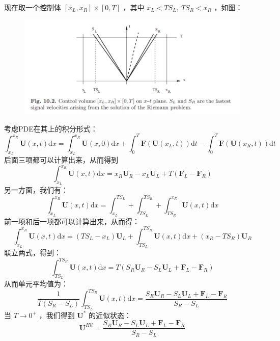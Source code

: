 \documentclass{book}
\begin{document}
\begin{example}
\begin{example}{}{}
\begin{example}
\begin{example}
\begin{example}
现在取一个控制体 $[x_L,x_R]\times[0,T]$ ，其中 $x_L<TS_L,\ TS_R<x_R$ ，如图：
\begin{figure}[htp]
    \centering
    \label{fig:}
    \includegraphics[width=0.7\linewidth]{fig/HLL.png}
    \caption{}
\end{figure}
考虑PDE在其上的积分形式：
\begin{equation}
    \displaystyle\int_{x_L}^{x_R}\mathbf U(x,t)\mathrm dx=\displaystyle\int_{x_L}^{x_R}\mathbf U(x,0)\mathrm dx+\int_{0}^T\mathbf F(\mathbf U(x_L,t))\mathrm dt-\int_0^T\mathbf F(\mathbf U(x_R,t))\mathrm dt
\end{equation}
后面三项都可以计算出来，从而得到
\begin{equation}
    \displaystyle\int_{x_L}^{x_R}\mathbf U(x,t)\mathrm dx=x_R\mathbf U_R-x_L\mathbf U_L+T(\mathbf F_L-\mathbf F_R)
\end{equation}
另一方面，我们有：
\begin{equation}
    \displaystyle\int_{x_L}^{x_R}\mathbf U(x,t)\mathrm dx=\int_{x_L}^{TS_L}+\int_{TS_L}^{TS_R}+\int_{TS_R}^{x_R}\mathbf U(x,t)\mathrm dx
\end{equation}
前一项和后一项都可以计算出来，从而得：
\begin{equation}
    \displaystyle\int_{x_L}^{x_R}\mathbf U(x,t)\mathrm dx=(TS_L-x_L)\mathbf U_L+\int_{TS_L}^{TS_R}\mathbf U(x,t)\mathrm dx+(x_R-TS_R)\mathbf U_R
\end{equation}
联立两式，得到：
\begin{equation}
    \displaystyle\int_{TS_L}^{TS_R}\mathbf U(x,t)\mathrm dx=T(S_R\mathbf U_R-S_L\mathbf U_L+\mathbf F_L-\mathbf F_R)
\end{equation}
从而单元平均值为：
\begin{equation}
    \displaystyle\frac{1}{T(S_R-S_L)}\int_{TS_L}^{TS_R}\mathbf U(x,t)\mathrm dx=\frac{S_R\mathbf U_R-S_L\mathbf U_L+\mathbf F_L-\mathbf F_R}{S_R-S_L}
\end{equation}
当 $T\to0^+$ ，我们得到 $\mathbf U^*$ 的近似状态：
\begin{equation}
    \mathbf U^{Hll}=\displaystyle\frac{S_R\mathbf U_R-S_L\mathbf U_L+\mathbf F_L-\mathbf F_R}{S_R-S_L}

\end{equation}
\end{example}
\end{example}
\end{example}
\end{example}
\end{example}
\end{document}
